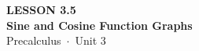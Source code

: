 \documentclass[aspectratio=169, 11pt]{beamer}
\begin{document}
{
\begin{frame}[plain]
  \vspace{2.8cm}\hspace{0.55cm}%
  \begin{minipage}{0.9\textwidth}
    {\color{goldacc}\bfseries\small LESSON 3.5}\\[0.5cm]
    {\color{white}\bfseries\LARGE Sine and Cosine Function Graphs}\\[1.2cm]
    {\color{skymid}\small Precalculus~$\cdot$~Unit 3}
  \end{minipage}
\end{frame}
}

\begin{frame}[t, plain]
\end{frame}
\end{document}
